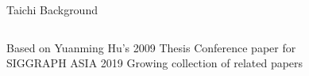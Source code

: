 \placelogofalse
\begin{frame}{Taichi Background}
\begin{columns}
\centering
\begin{outline}
    \1 Based on Yuanming Hu's 2009 Thesis
    \1 Conference paper for \\ SIGGRAPH ASIA 2019
    \1 Growing collection of related papers
\end{outline}

\centering
{}


\end{columns}

\end{frame}
\placelogotrue
